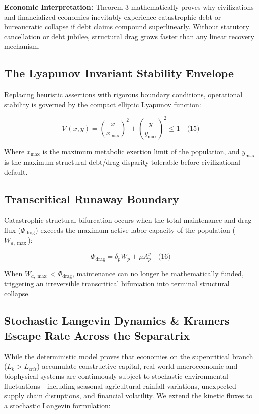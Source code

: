 \documentclass[preprint,12pt,authoryear]{elsarticle}
\theoremstyle{definition}
\begin{document}
\textbf{Economic Interpretation:} Theorem 3 mathematically proves why civilizations and financialized economies inevitably experience catastrophic debt or bureaucratic collapse if debt claims compound superlinearly. Without statutory cancellation or debt jubilee, structural drag grows faster than any linear recovery mechanism.

\subsection{The Lyapunov Invariant Stability Envelope}

Replacing heuristic assertions with rigorous boundary conditions, operational stability is governed by the compact elliptic Lyapunov function:

$$\mathcal{V}(x, y) = \left( \frac{x}{x_{\max}} \right)^2 + \left( \frac{y}{y_{\max}} \right)^2 \le 1 \quad \text{(15)}$$

Where $x_{\max}$ is the maximum metabolic exertion limit of the population, and $y_{\max}$ is the maximum structural debt/drag disparity tolerable before civilizational default.

\subsection{Transcritical Runaway Boundary}

Catastrophic structural bifurcation occurs when the total maintenance and drag flux ($\Phi_{ \text{drag}}$) exceeds the maximum active labor capacity of the population ($W_{a,\max}$):

$$\Phi_{ \text{drag}} = \delta_p W_p + \mu A_p^\nu \quad \text{(16)}$$

When $W_{a,\max} < \Phi_{ \text{drag}}$, maintenance can no longer be mathematically funded, triggering an irreversible transcritical bifurcation into terminal structural collapse.

\subsection{Stochastic Langevin Dynamics \& Kramers Escape Rate Across the Separatrix}

While the deterministic model proves that economies on the supercritical branch ($L_k > L_{crit}$) accumulate constructive capital, real-world macroeconomic and biophysical systems are continuously subject to stochastic environmental fluctuations---including seasonal agricultural rainfall variations, unexpected supply chain disruptions, and financial volatility. We extend the kinetic fluxes to a stochastic Langevin formulation:
\end{document}
